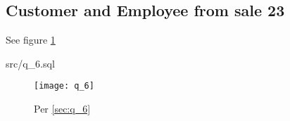 \documentclass{article}
\begin{document}
\subsection{Customer and Employee from sale 23}
See figure \ref{fig:q_6}
\label{sec:q_6}
\begin{lstinputlisting}[float]{src/q_6.sql}
\end{lstinputlisting}
\begin{figure}[H]\centering
	\caption{Per \ref{sec:q_6}}
	\texttt{[image: q\_6]}
	\label{fig:q_6}
\end{figure}
\end{document}

